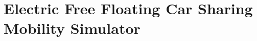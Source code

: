 
\chapter{Electric Free Floating Car Sharing Mobility Simulator}
\label{chap:5_simulator}
	\graphicspath{{Chapter5/}}


%











